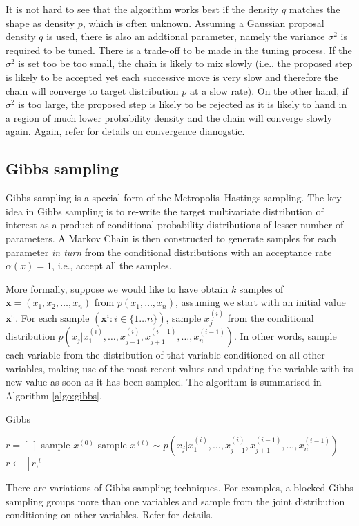 It is not hard to see that the algorithm works best if the density $q$ matches the shape as density $p$, which is often unknown. Assuming a Gaussian proposal density $q$ is used, there is also an addtional parameter, namely the variance $\sigma^2$ is required to be tuned. There is a trade-off to be made in the tuning process. If the $\sigma^2$ is set too be too small, the chain is likely to mix slowly (i.e., the proposed step is likely to be accepted yet each successive move is very slow and therefore the chain will converge to target distribution $p$ at a slow rate). On the other hand, if $\sigma^2$ is too large, the proposed step is likely to be rejected as it is likely to hand in a region of much lower probability density and the chain will converge slowly again. Again, refer \cite{RCP05} for details on convergence dianogstic.

\subsection{Gibbs sampling}
Gibbs sampling \cite{GS84} is a special form of the Metropolis–Hastings sampling. The key idea in Gibbs sampling is to re-write the target multivariate distribution of interest as a product of conditional probability distributions of lesser number of parameters. A Markov Chain is then constructed to generate samples for each parameter \emph{in turn} from the conditional distributions with an acceptance rate $\alpha(x)=1$, i.e., accept all the samples.

More formally, suppose we would like to have obtain $k$ samples of $\mathbf{x}=(x_1,x_2,\ldots, x_n)$ from $p(x_1, \ldots, x_n)$, assuming we start with an initial value $\mathbf{x}^{0}$. For each sample $(\mathbf{x}^{i}: i \in \{1 \dots n\})$, sample $x_j^{(i)}$ from the conditional distribution $p(x_j|x_1^{(i)},\dots,x_{j-1}^{(i)},x_{j+1}^{(i-1)},\dots,x_n^{(i-1)})$. In other words, sample each variable from the distribution of that variable conditioned on all other variables, making use of the most recent values and updating the variable with its new value as soon as it has been sampled. The algorithm is summarised in Algorithm \ref{algo:gibbs}.

\begin{algorithm}
\caption{Gibbs}\label{algo:gibbs}
\begin{algorithmic}[1]
\State $r = [\ ]$
\State sample $x^{(0)}$
\Repeat
  \State sample $x^{(t)} \sim p(x_j|x_1^{(i)},\dots,x_{j-1}^{(i)},x_{j+1}^{(i-1)},\dots,x_n^{(i-1)})$
  \State $r \gets [r,^{t}]$
\EndFunction
\end{algorithmic}
\end{algorithm}

There are variations of Gibbs sampling techniques. For examples, a blocked Gibbs sampling groups more than one variables and sample from the joint distribution conditioning on other variables. Refer \cite{RCP05} for details. 




